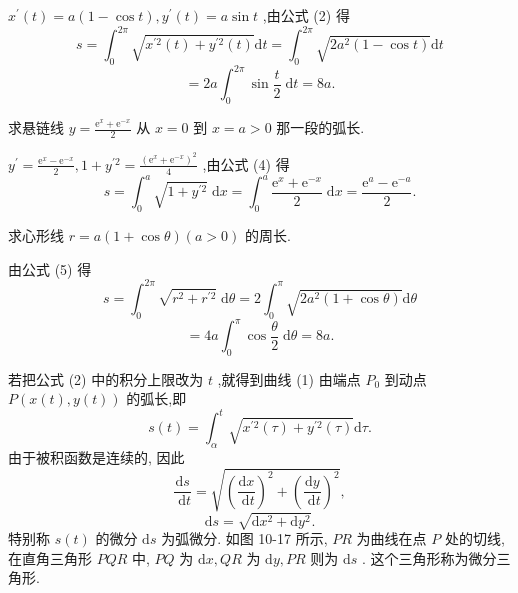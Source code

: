 \begin{solution}

\end{solution}
\({x}^{\prime }\left( t\right)  = a\left( {1 - \cos t}\right) ,{y}^{\prime }\left( t\right)  = a\sin t\) ,由公式 (2) 得
\[
s = {\int }_{0}^{2\pi }\sqrt{{x}^{\prime 2}\left( t\right)  + {y}^{\prime 2}\left( t\right) }\mathrm{d}t = {\int }_{0}^{2\pi }\sqrt{2{a}^{2}\left( {1 - \cos t}\right) }\mathrm{d}t
\]
\[
= {2a}{\int }_{0}^{2\pi }\sin \frac{t}{2}\mathrm{\;d}t = {8a}.
\]
\begin{example}

\end{example}
求悬链线 \(y = \frac{{\mathrm{e}}^{x} + {\mathrm{e}}^{-x}}{2}\) 从 \(x = 0\) 到 \(x = a > 0\) 那一段的弧长.

\begin{solution}

\end{solution}
\({y}^{\prime } = \frac{{\mathrm{e}}^{x} - {\mathrm{e}}^{-x}}{2},1 + {y}^{\prime 2} = \frac{{\left( {\mathrm{e}}^{x} + {\mathrm{e}}^{-x}\right) }^{2}}{4}\) ,由公式 (4) 得
\[
s = {\int }_{0}^{a}\sqrt{1 + {y}^{\prime 2}}\mathrm{\;d}x = {\int }_{0}^{a}\frac{{\mathrm{e}}^{x} + {\mathrm{e}}^{-x}}{2}\mathrm{\;d}x = \frac{{\mathrm{e}}^{a} - {\mathrm{e}}^{-a}}{2}.
\]
\begin{example}

\end{example}
求心形线 \(r = a\left( {1 + \cos \theta }\right) \left( {a > 0}\right)\) 的周长.

\begin{solution}

\end{solution}
由公式 (5) 得
\[
s = {\int }_{0}^{2\pi }\sqrt{{r}^{2} + {r}^{\prime 2}}\mathrm{\;d}\theta  = 2{\int }_{0}^{\pi }\sqrt{2{a}^{2}\left( {1 + \cos \theta }\right) }\mathrm{d}\theta
\]
\[
= {4a}{\int }_{0}^{\pi }\cos \frac{\theta }{2}\mathrm{\;d}\theta  = {8a}.
\]
\begin{remark}

\end{remark}
若把公式 (2) 中的积分上限改为 \(t\) ,就得到曲线 (1) 由端点 \({P}_{0}\) 到动点 \(P\left( {x\left( t\right) ,y\left( t\right) }\right)\) 的弧长,即
\[
s\left( t\right)  = {\int }_{\alpha }^{t}\sqrt{{x}^{\prime 2}\left( \tau \right)  + {y}^{\prime 2}\left( \tau \right) }\mathrm{d}\tau .
\]
由于被积函数是连续的, 因此
\[
\frac{\mathrm{d}s}{\mathrm{\;d}t} = \sqrt{{\left( \frac{\mathrm{d}x}{\mathrm{\;d}t}\right) }^{2} + {\left( \frac{\mathrm{d}y}{\mathrm{\;d}t}\right) }^{2}},
\]
\[
\mathrm{d}s = \sqrt{\mathrm{d}{x}^{2} + \mathrm{d}{y}^{2}}. \tag{6}
\]
特别称 \(s\left( t\right)\) 的微分 \(\mathrm{d}s\) 为弧微分. 如图 10-17 所示, \({PR}\) 为曲线在点 \(P\) 处的切线,在直角三角形 \({PQR}\) 中, \({PQ}\) 为 \(\mathrm{d}x,{QR}\) 为 \(\mathrm{d}y,{PR}\) 则为 \(\mathrm{d}s\) . 这个三角形称为微分三角形.

